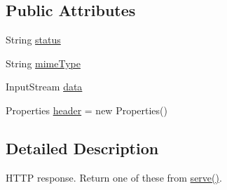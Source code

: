 \subsection*{\-Public \-Attributes}
\begin{DoxyCompactItemize}
\item 
\-String \hyperlink{classcom_1_1axcoto_1_1shinjuku_1_1maki_1_1_nano_h_t_t_p_d_1_1_response_a4e531c185af848083db0808335a78168}{status}
\item 
\-String \hyperlink{classcom_1_1axcoto_1_1shinjuku_1_1maki_1_1_nano_h_t_t_p_d_1_1_response_a09c78e464072ccab667894f0d179fbdf}{mime\-Type}
\item 
\-Input\-Stream \hyperlink{classcom_1_1axcoto_1_1shinjuku_1_1maki_1_1_nano_h_t_t_p_d_1_1_response_a249c1175304a02be30d8409a6b378d24}{data}
\item 
\-Properties \hyperlink{classcom_1_1axcoto_1_1shinjuku_1_1maki_1_1_nano_h_t_t_p_d_1_1_response_a6e0174d9737ad5af0e26b24e5d2e16d4}{header} = new \-Properties()
\end{DoxyCompactItemize}


\subsection{\-Detailed \-Description}
\-H\-T\-T\-P response. \-Return one of these from \hyperlink{classcom_1_1axcoto_1_1shinjuku_1_1maki_1_1_nano_h_t_t_p_d_a0ef7299275c6b9aae10e13fdbe9df1da}{serve()}. 

